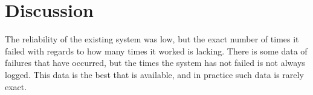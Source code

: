 \section{Discussion}
The reliability of the existing system was low, but the exact number of times it failed with regards to how many times it worked is lacking. There is some data of failures that have occurred, but the times the system has not failed is not always logged. This data is the best that is available, and in practice such data is rarely exact.